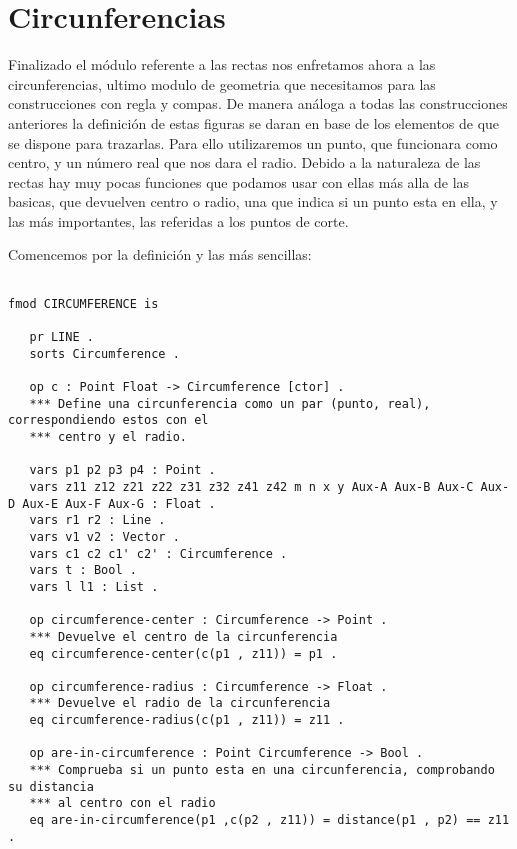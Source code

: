 \documentclass[12pt,a4paper]{book}
\begin{document}
\chapter{Circunferencias}\label{cap.3}

Finalizado el m\'odulo referente a las rectas nos enfretamos ahora a las circunferencias, ultimo modulo de geometria que necesitamos para las construcciones con regla y compas. De manera an\'aloga a todas las construcciones anteriores la definici\'on de estas figuras se daran en base de los elementos de que se dispone para trazarlas. Para ello utilizaremos un punto, que funcionara como centro, y un n\'umero real que nos dara el radio. Debido a la naturaleza de las rectas hay muy pocas funciones que podamos usar con ellas m\'as alla de las basicas, que devuelven centro o radio, una que indica si un punto esta en ella, y las más importantes, las referidas a los puntos de corte. \par

Comencemos por la definici\'on y las m\'as sencillas:

\begin{verbatim}

fmod CIRCUMFERENCE is

   pr LINE .
   sorts Circumference .

   op c : Point Float -> Circumference [ctor] .
   *** Define una circunferencia como un par (punto, real), correspondiendo estos con el 
   *** centro y el radio.
	
   vars p1 p2 p3 p4 : Point .
   vars z11 z12 z21 z22 z31 z32 z41 z42 m n x y Aux-A Aux-B Aux-C Aux-D Aux-E Aux-F Aux-G : Float .
   vars r1 r2 : Line .
   vars v1 v2 : Vector .
   vars c1 c2 c1' c2' : Circumference .
   vars t : Bool .
   vars l l1 : List .
		
   op circumference-center : Circumference -> Point .
   *** Devuelve el centro de la circunferencia
   eq circumference-center(c(p1 , z11)) = p1 .

   op circumference-radius : Circumference -> Float .
   *** Devuelve el radio de la circunferencia
   eq circumference-radius(c(p1 , z11)) = z11 .

   op are-in-circumference : Point Circumference -> Bool .
   *** Comprueba si un punto esta en una circunferencia, comprobando su distancia 
   *** al centro con el radio
   eq are-in-circumference(p1 ,c(p2 , z11)) = distance(p1 , p2) == z11 .

\end{verbatim}  
\end{document}
